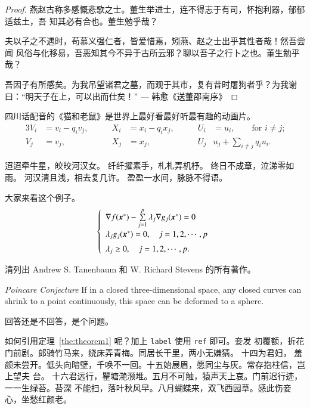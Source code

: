 \begin{proof}
燕赵古称多感慨悲歌之士。董生举进士，连不得志于有司，怀抱利器，郁郁适兹土，吾
知其必有合也。董生勉乎哉？

夫以子之不遇时，苟慕义强仁者，皆爱惜焉，矧燕、赵之士出乎其性者哉！然吾尝闻
风俗与化移易，吾恶知其今不异于古所云邪？聊以吾子之行卜之也。董生勉乎哉？

吾因子有所感矣。为我吊望诸君之墓，而观于其市，复有昔时屠狗者乎？为我谢
曰：“明天子在上，可以出而仕矣！” \hfill --- 韩愈《送董邵南序》
\end{proof}

\begin{corollary}
  四川话配音的《猫和老鼠》是世界上最好看最好听最有趣的动画片。
\begin{alignat}{3}
V_i & =v_i - q_i v_j, & \qquad X_i & = x_i - q_i x_j,
 & \qquad U_i & = u_i,
 \qquad \text{for $i\ne j$;}\label{eq:B}\\
V_j & = v_j, & \qquad X_j & = x_j,
  & \qquad U_j & u_j + \sum_{i\ne j} q_i u_i.
\end{alignat}
\end{corollary}

迢迢牵牛星，皎皎河汉女。
纤纤擢素手，札札弄机杼。
终日不成章，泣涕零如雨。
河汉清且浅，相去复几许。
盈盈一水间，脉脉不得语。

\begin{example}
  大家来看这个例子。
\begin{equation}
\label{ktc}
\left\{\begin{array}{l}
\nabla f({\mbox{\boldmath $x$}}^*)-\sum\limits_{j=1}^p\lambda_j\nabla g_j({\mbox{\boldmath $x$}}^*)=0\\[0.3cm]
\lambda_jg_j({\mbox{\boldmath $x$}}^*)=0,\quad j=1,2,\cdots,p\\[0.2cm]
\lambda_j\ge 0,\quad j=1,2,\cdots,p.
\end{array}\right.
\end{equation}
\end{example}

\begin{exercise}
  清列出 Andrew S. Tanenbaum 和 W. Richard Stevens 的所有著作。
\end{exercise}

\begin{conjecture} \textit{Poincare Conjecture} If in a closed three-dimensional
  space, any closed curves can shrink to a point continuously, this space can be
  deformed to a sphere.
\end{conjecture}

\begin{problem}
 回答还是不回答，是个问题。 
\end{problem}

如何引用定理~\ref{the:theorem1} 呢？加上 \verb|label| 使用 \verb|ref| 即可。妾发
初覆额，折花门前剧。郎骑竹马来，绕床弄青梅。同居长干里，两小无嫌猜。 十四为君妇，
羞颜未尝开。低头向暗壁，千唤不一回。十五始展眉，愿同尘与灰。常存抱柱信，岂上望夫
台。 十六君远行，瞿塘滟滪堆。五月不可触，猿声天上哀。门前迟行迹，一一生绿苔。苔深
不能扫，落叶秋风早。八月蝴蝶来，双飞西园草。感此伤妾心，坐愁红颜老。